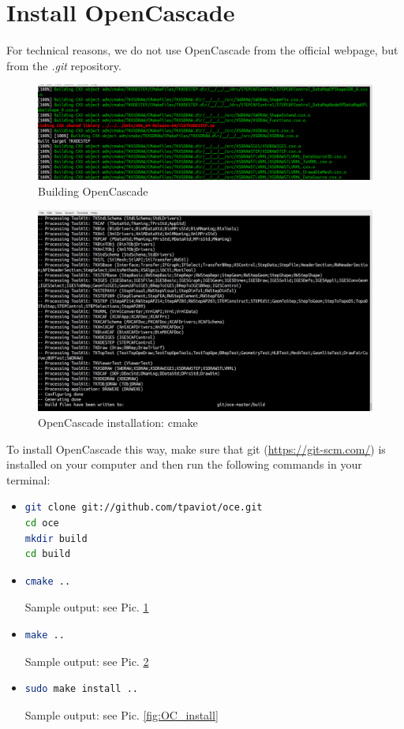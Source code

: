 \documentclass[11pt,a4paper,article,bibtotoc,idxtotoc,headsepline,footsepline,footexclude,DIV13,oneside]{scrbook}
\begin{document}
\section{Install OpenCascade}
For technical reasons, we do not use OpenCascade from the official webpage, but from the \textit{.git} repository. 
\begin{figure}
\centering
\includegraphics[scale=0.3]{img/OC_Build5_cut.png}
\caption{Building OpenCascade}
\label{fig:OC_build}
\end{figure}
\begin{figure}
\centering
\includegraphics[scale=0.3]{img/OC_CMake2.png}
\caption{OpenCascade installation: cmake}
\label{fig:OC_cmake}
\end{figure}
To install OpenCascade this way, make sure that git (\href{https://git-scm.com/}{https://git-scm.com/}) is installed on your computer and then run the following commands in your terminal:
\begin{itemize}
\item \begin{lstlisting}[language=bash]
git clone git://github.com/tpaviot/oce.git
cd oce
mkdir build
cd build
\end{lstlisting}
	
\item 
\begin{lstlisting}[language=bash]
cmake .. 
\end{lstlisting}	
Sample output: see Pic. \ref{fig:OC_build}
\item 
\begin{lstlisting}[language=bash]
make .. 
\end{lstlisting}	
Sample output: see Pic. \ref{fig:OC_cmake}
\item 
\begin{lstlisting}[language=bash]
sudo make install .. 
\end{lstlisting}	
Sample output: see Pic. \ref{fig:OC_install}
\end{itemize}
\end{document}
